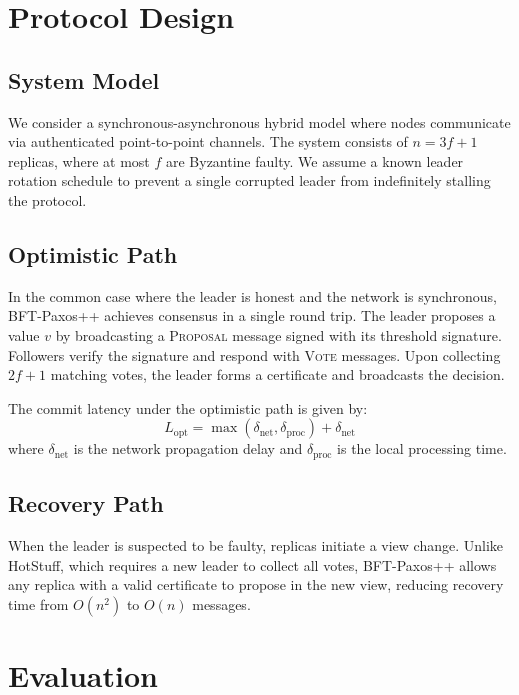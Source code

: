 \documentclass[
    language=english,
    doctype=conference-paper,
    institution=none,
]{../../omnilatex}
\begin{document}
\section{Protocol Design}
\label{sec:protocol}

\subsection{System Model}

We consider a synchronous-asynchronous hybrid model where nodes communicate via authenticated
point-to-point channels. The system consists of $n = 3f + 1$ replicas, where at most $f$
are Byzantine faulty. We assume a known leader rotation schedule to prevent a single
corrupted leader from indefinitely stalling the protocol.

\subsection{Optimistic Path}

In the common case where the leader is honest and the network is synchronous, BFT-Paxos++
achieves consensus in a single round trip. The leader proposes a value $v$ by broadcasting
a \textsc{Proposal} message signed with its threshold signature. Followers verify the
signature and respond with \textsc{Vote} messages. Upon collecting $2f + 1$ matching votes,
the leader forms a certificate and broadcasts the decision.

The commit latency under the optimistic path is given by:
\begin{equation}
    \label{eq:latency-optimistic}
    L_{\text{opt}} = \max(\delta_{\text{net}}, \delta_{\text{proc}}) + \delta_{\text{net}}
\end{equation}
where $\delta_{\text{net}}$ is the network propagation delay and $\delta_{\text{proc}}$ is
the local processing time.

\subsection{Recovery Path}

When the leader is suspected to be faulty, replicas initiate a view change. Unlike HotStuff,
which requires a new leader to collect all votes, BFT-Paxos++ allows any replica with a
valid certificate to propose in the new view, reducing recovery time from $O(n^2)$ to $O(n)$
messages.

\section{Evaluation}
\label{sec:evaluation}
\end{document}
